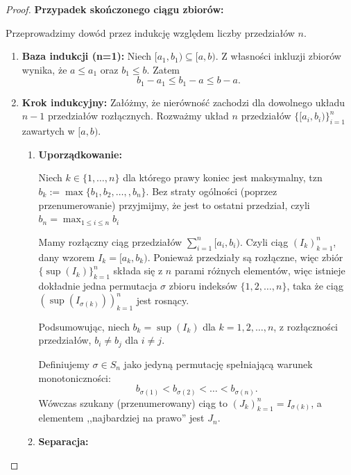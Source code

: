 \begin{proof}
	\textbf{Przypadek skończonego ciągu zbiorów:} 

	Przeprowadzimy dowód przez indukcję względem liczby przedziałów $n$.
	\begin{enumerate}[label=\arabic*.]
		\item \textbf{Baza indukcji (n=1):} Niech $[a_1,b_1) \subseteq [a,b)$. Z własności inkluzji zbiorów wynika, że $a\le a_1$ oraz $b_1\le b$. Zatem
			\[
			b_1-a_1 \le  b_1 - a \le b-a
			.\] 
		\item \textbf{Krok indukcyjny:} Załóżmy, że nierówność zachodzi dla dowolnego układu $n-1$ przedziałów rozłącznych. Rozważmy układ $n$ przedziałów $\{[a_{i}, b_{i})\}_{i=1}^{n} $ zawartych w $[a,b)$.
			\begin{enumerate}[label=\theenumi\arabic*., ref=\theenumi.\arabic*]
				\item \textbf{Uporządkowanie:}

					Niech $k\in \{1,\ldots,n\} $ dla którego prawy koniec jest maksymalny, tzn $b_{k} := \max\{b_1,b_2,\ldots,, b_{n}\} $. Bez straty ogólności (poprzez przenumerowanie) przyjmijmy, że jest to ostatni przedział, czyli $b_{n}= \max_{1\le i\le n}b_{i}$

					\begin{remark} Mamy rozłączny ciąg przedziałów $\sum_{i=1}^{n} [a_{i}, b_{i})$. Czyli ciąg $\left( I_{k} \right)_{k=1}^{n}$, dany wzorem $I_{k} = [a_{k}, b_{k})$. Ponieważ przedziały są rozłączne, więc zbiór $\{\sup ( I_{k} ) \}_{k=1}^{n}$ składa się z $n$ parami różnych elementów, więc istnieje dokładnie jedna permutacja $\sigma$ zbioru indeksów $\{1,2,\ldots, n\} $, taka że ciąg $( \sup ( I_{\sigma ( k ) }) )_{k=1}^{n}$ jest rosnący.

						Podsumowując, niech $b_{k} = \sup \left( I_{k} \right) $ dla $k=1,2,\ldots,n$, z rozłączności przedziałów, $b_{i}\neq b_{j}$ dla $i\neq j$.

						Definiujemy $\sigma \in S_{n}$ jako jedyną permutację spełniającą warunek monotoniczności:
						\[
						b_{\sigma\left( 1 \right) }<b_{\sigma\left( 2 \right) }<\ldots< b_{\sigma\left( n \right) }
						.\] 
						Wówczas szukany (przenumerowany) ciąg to $\left( J_{k} \right)_{k=1}^{n} = I_{\sigma(k)}$, a elementem ,,najbardziej na prawo'' jest $J_{n}$.
					\end{remark} 
				\item \textbf{Separacja:} 


\end{enumerate}
\end{enumerate}
\end{proof}
